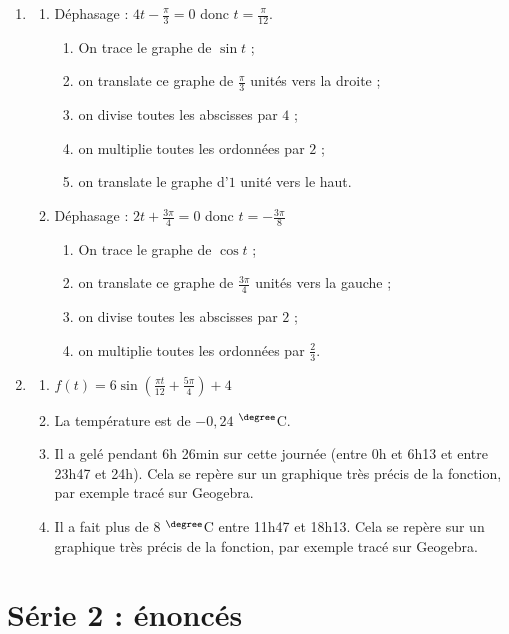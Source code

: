 \documentclass[a4paper,fontsize=13pt]{scrreprt}
\theoremstyle{plain}
\theoremstyle{definition}
\newenvironment{benumerate}[1][0pt]{\begin{enumerate}\renewcommand{\makelabel}[1]{\textbf{##1}}\setlength{\itemsep}{#1}}{\end{enumerate}}
\renewcommand{\d}{\displaystyle}
\begin{document}
\begin{benumerate}[10pt]
\item \begin{benumerate}[5pt]
\item Déphasage : $\d 4t-\frac{\pi}{3}=0$ donc $\d t =\frac{\pi}{12}$.
\begin{benumerate}
\item On trace le graphe de $\sin t$ ;
\item on translate ce graphe de $\d \frac{\pi}{3}$ unités vers la droite ;
\item on divise toutes les abscisses par $4$ ;
\item on multiplie toutes les ordonnées par $2$ ;
\item on translate le graphe d'$1$ unité vers le haut.
\end{benumerate}
\item Déphasage : $\d 2t+\frac{3\pi}{4}=0$ donc $\d t = -\frac{3\pi}{8}$
\begin{benumerate}
\item On trace le graphe de $\cos t$ ;
\item on translate ce graphe de $\d \frac{3\pi}{4}$ unités vers la gauche ;
\item on divise toutes les abscisses par $2$ ;
\item on multiplie toutes les ordonnées par $\d \frac{2}{3}$.
\end{benumerate}
\end{benumerate}

\item \begin{benumerate}[5pt]
\item $\d f(t)=6\sin\left(\frac{\pi t}{12}+\frac{5\pi}{4}\right)+4$
\item La température est de $-0,24$ ${}^{\degree}$C.
\item Il a gelé pendant 6h 26min sur cette journée (entre 0h et 6h13 et entre 23h47 et 24h). Cela se repère sur un graphique très précis de la fonction, par exemple tracé sur Geogebra.
\item Il a fait plus de 8 ${}^{\degree}$C entre 11h47 et 18h13. Cela se repère sur un graphique très précis de la fonction, par exemple tracé sur Geogebra.
\end{benumerate}
\end{benumerate}

\newpage

\section{Série 2 : énoncés}
\end{document}
